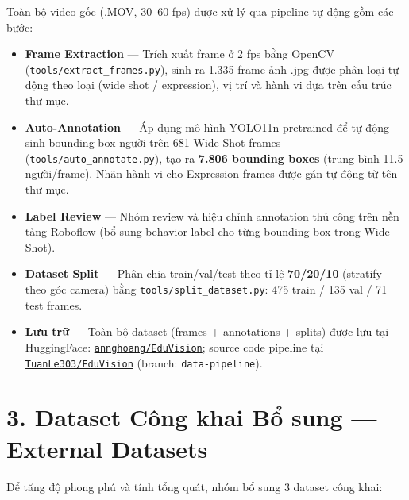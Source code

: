 \documentclass[a4paper,10pt]{article}
\begin{document}
Toàn bộ video gốc (.MOV, 30--60 fps) được xử lý qua pipeline tự động gồm các bước:

\begin{itemize}[noitemsep, topsep=1pt]
    \item \textbf{Frame Extraction} --- Trích xuất frame ở 2 fps bằng OpenCV (\texttt{tools/extract\_frames.py}), sinh ra 1.335 frame ảnh .jpg được phân loại tự động theo loại (wide shot / expression), vị trí và hành vi dựa trên cấu trúc thư mục.
    \item \textbf{Auto-Annotation} --- Áp dụng mô hình YOLO11n pretrained để tự động sinh bounding box người trên 681 Wide Shot frames (\texttt{tools/auto\_annotate.py}), tạo ra \textbf{7.806 bounding boxes} (trung bình 11.5 người/frame). Nhãn hành vi cho Expression frames được gán tự động từ tên thư mục.
    \item \textbf{Label Review} --- Nhóm review và hiệu chỉnh annotation thủ công trên nền tảng Roboflow (bổ sung behavior label cho từng bounding box trong Wide Shot).
    \item \textbf{Dataset Split} --- Phân chia train/val/test theo tỉ lệ \textbf{70/20/10} (stratify theo góc camera) bằng \texttt{tools/split\_dataset.py}: 475 train / 135 val / 71 test frames.
    \item \textbf{Lưu trữ} --- Toàn bộ dataset (frames + annotations + splits) được lưu tại HuggingFace: \href{https://huggingface.co/datasets/annghoang/EduVision}{\texttt{annghoang/EduVision}}; source code pipeline tại \href{https://github.com/TuanLe303/EduVision}{\texttt{TuanLe303/EduVision}} (branch: \texttt{data-pipeline}).
\end{itemize}

\section*{3. Dataset Công khai Bổ sung --- External Datasets}

Để tăng độ phong phú và tính tổng quát, nhóm bổ sung 3 dataset công khai:
\end{document}
